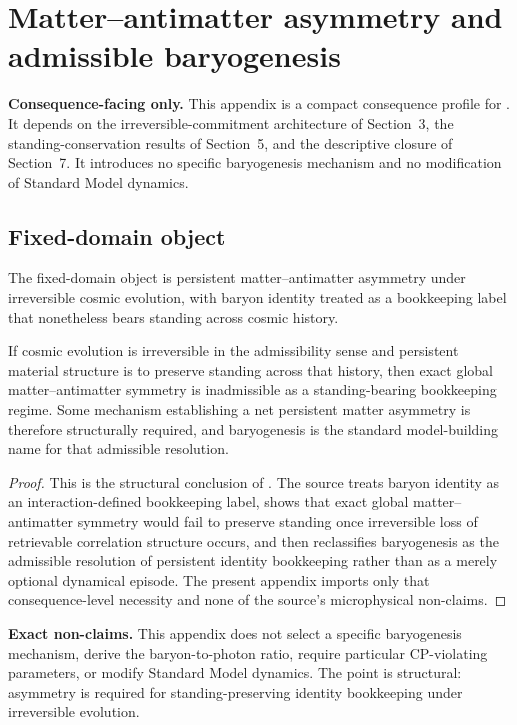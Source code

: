 \section{Matter--antimatter asymmetry and admissible baryogenesis}
\label{app:baryogenesis}

\begin{fixedbox}
\textbf{Consequence-facing only.} This appendix is a compact consequence profile for \baryogenesisdoc{}. It depends on the irreversible-commitment architecture of Section~3, the standing-conservation results of Section~5, and the descriptive closure of Section~7. It introduces no specific baryogenesis mechanism and no modification of Standard Model dynamics.
\end{fixedbox}

\subsection*{Fixed-domain object}
The fixed-domain object is persistent matter--antimatter asymmetry under irreversible cosmic evolution, with baryon identity treated as a bookkeeping label that nonetheless bears standing across cosmic history.

\begin{proposition}
If cosmic evolution is irreversible in the admissibility sense and persistent material structure is to preserve standing across that history, then exact global matter--antimatter symmetry is inadmissible as a standing-bearing bookkeeping regime. Some mechanism establishing a net persistent matter asymmetry is therefore structurally required, and baryogenesis is the standard model-building name for that admissible resolution.
\end{proposition}

\begin{proof}
This is the structural conclusion of \baryogenesisdoc{}. The source treats baryon identity as an interaction-defined bookkeeping label, shows that exact global matter--antimatter symmetry would fail to preserve standing once irreversible loss of retrievable correlation structure occurs, and then reclassifies baryogenesis as the admissible resolution of persistent identity bookkeeping rather than as a merely optional dynamical episode. The present appendix imports only that consequence-level necessity and none of the source's microphysical non-claims.\cite{MaleyBaryogenesis}
\end{proof}

\begin{reviewbox}
\textbf{Exact non-claims.} This appendix does not select a specific baryogenesis mechanism, derive the baryon-to-photon ratio, require particular CP-violating parameters, or modify Standard Model dynamics. The point is structural: asymmetry is required for standing-preserving identity bookkeeping under irreversible evolution.\cite{MaleyBaryogenesis}
\end{reviewbox}
